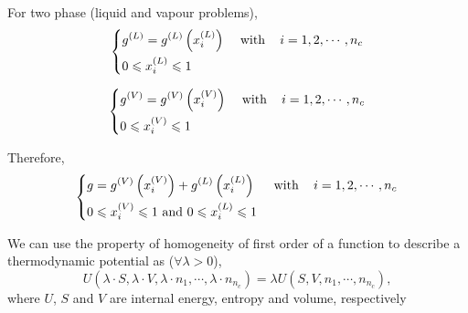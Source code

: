 For two phase (liquid and vapour problems),
\begin{displaymath}
  \left \{
  \begin{aligned}
    & \mfr[g]{}{L} = \mfr[g]{}{L}\left(\mfr[x]{i}{L}\right) && \text{ with } \;\;\;i = 1, 2, \cdots, n_{c} \\
    & 0 \leq \mfr[x]{i}{L} \leq 1 
  \end{aligned} \right.
\end{displaymath} 

\begin{displaymath}
  \left \{
  \begin{aligned}
    & \mfr[g]{}{V} = \mfr[g]{}{V}\left(\mfr[x]{i}{V}\right) && \text{ with } \;\;\;i = 1, 2, \cdots, n_{c} \\
    & 0 \leq \mfr[x]{i}{V} \leq 1 
  \end{aligned} \right.
\end{displaymath} 

Therefore,
\begin{equation}
  \left \{
  \begin{aligned}
    & g = \mfr[g]{}{V}\left(\mfr[x]{i}{V}\right) + \mfr[g]{}{L}\left(\mfr[x]{i}{L}\right) && \text{ with } \;\;\;i = 1, 2, \cdots, n_{c} \\
    & 0 \leq \mfr[x]{i}{V} \leq 1 \text{ and } 0 \leq \mfr[x]{i}{L} \leq 1 
  \end{aligned} \right.
\end{equation} 

We can use the property of homogeneity of first order of a function to describe a thermodynamic potential as ($\forall\lambda > 0$),
\begin{displaymath}
   U\left(\lambda\cdot S, \lambda\cdot V,  \lambda\cdot n_{1}, \cdots, \lambda\cdot n_{n_{c}}\right) = \lambda U\left(S, V, n_{1}, \cdots, n_{n_{c}}\right),
\end{displaymath}
where $U$, $S$ and $V$ are internal energy, entropy and volume, respectively

